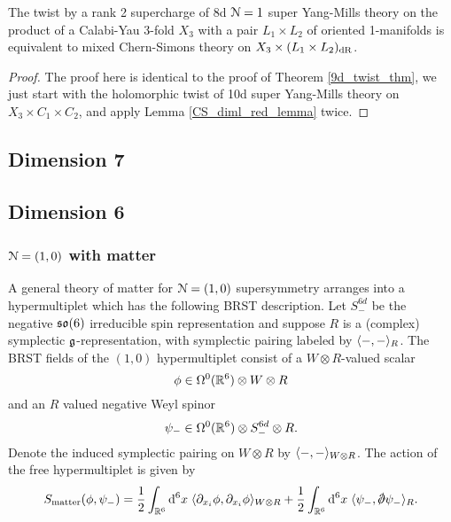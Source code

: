 \documentclass[10pt, oneside]{article}
\begin{document}
\begin{theorem} \label{8d_rank2_twist_thm}
The twist by a rank 2 supercharge of 8d $\mathcal{N}=1$ super Yang-Mills theory on the product of a Calabi-Yau 3-fold $X_3$ with a pair $L_1 \times L_2$ of oriented 1-manifolds is equivalent to mixed Chern-Simons theory on $X_3 \times (L_1 \times L_2)_{\mathrm{dR}}$.
\end{theorem}

\begin{proof}
The proof here is identical to the proof of Theorem \ref{9d_twist_thm}, we just start with the holomorphic twist of 10d super Yang-Mills theory on $X_3 \times C_1 \times C_2$, and apply Lemma \ref{CS_diml_red_lemma} twice.
\end{proof}



\subsection{Dimension 7}


\subsection{Dimension 6}



\subsubsection{$\mathcal N=(1,0)$ with matter}

A general theory of matter for $\mathcal N = (1,0)$ supersymmetry arranges into a hypermultiplet which has the following BRST description.
Let $S_-^{6d}$ be the negative $\mathfrak{so}(6)$ irreducible spin representation and suppose $R$ is a (complex) symplectic $\mathfrak g$-representation, with symplectic pairing labeled by $\langle-,-\rangle_R$. 
The BRST fields of the $(1,0)$ hypermultiplet consist of a $W \otimes R$-valued scalar
\[
\phi \in \Omega^0(\mathbb R^6) \otimes W \otimes R
\]
and an $R$ valued negative Weyl spinor
\[
\psi_- \in \Omega^0(\mathbb R^6) \otimes S_-^{6d} \otimes R .
\]
Denote the induced symplectic pairing on $W \otimes R$ by $\langle-,-\rangle_{W \otimes R}$. 
The action of the free hypermultiplet is given by
\[
S_{\rm matter} (\phi, \psi_-) = \frac{1}{2} \int_{\RR^6} \d^6 x \; \<\partial_{x_i} \phi , \partial_{x_i} \phi\>_{W \otimes R} + \frac{1}{2} \int_{\RR^6} \d^6 x \;\<\psi_-, \sd \dd \psi_-\>_R .
\]
\end{document}
